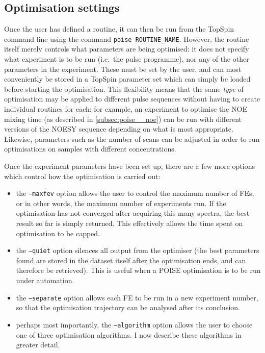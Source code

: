 \subsection{Optimisation settings}
\label{subsec:poise__settings}

Once the user has defined a routine, it can then be run from the TopSpin command line using the command \texttt{poise ROUTINE\_NAME}.
However, the routine itself merely controls what parameters are being optimised: it does not specify what experiment is to be run (i.e.\ the pulse programme), nor any of the other parameters in the experiment.
These must be set by the user, and can most conveniently be stored in a TopSpin parameter set which can simply be loaded before starting the optimisation.
This flexibility means that the same \textit{type} of optimisation may be applied to different pulse sequences without having to create individual routines for each: for example, an experiment to optimise the NOE mixing time (as described in \cref{subsec:poise__noe}) can be run with different versions of the NOESY sequence depending on what is most appropriate.
Likewise, parameters such as the number of scans can be adjusted in order to run optimisations on samples with different concentrations.

Once the experiment parameters have been set up, there are a few more options which control how the optimisation is carried out:

\begin{itemize}
    \item the \texttt{--maxfev} option allows the user to control the maximum number of FEs, or in other words, the maximum number of experiments run.
        If the optimisation has not converged after acquiring this many spectra, the best result so far is simply returned.
        This effectively allows the time spent on optimisation to be capped.

    \item the \texttt{--quiet} option silences all output from the optimiser (the best parameters found are stored in the dataset itself after the optimisation ends, and can therefore be retrieved).
        This is useful when a POISE optimisation is to be run under automation.
        
    \item the \texttt{--separate} option allows each FE to be run in a new experiment number, so that the optimisation trajectory can be analysed after its conclusion.

    \item perhaps most importantly, the \texttt{--algorithm} option allows the user to choose one of three optimisation algorithms.
        I now describe these algorithms in greater detail.
\end{itemize}
